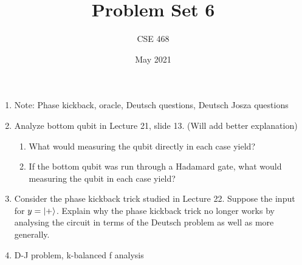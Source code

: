 \documentclass[12pt]{article}
\title{Problem Set 6}
\author{CSE 468}
\date{May 2021}
\begin{document}
\maketitle



\begin{enumerate}[font=\bfseries]

    \item Note: Phase kickback, oracle, Deutsch questions, Deutsch Josza questions
    \item Analyze bottom qubit in Lecture 21, slide 13. (Will add better explanation)
    \begin{enumerate}
        \item What would measuring the qubit directly in each case yield?
        \item If the bottom qubit was run through a Hadamard gate, what would measuring the qubit in each case yield?
    \end{enumerate}
    \item Consider the phase kickback trick studied in Lecture 22. Suppose the input for $y = \ket{+}$. Explain why the phase kickback trick no longer works by analysing the circuit in terms of the Deutsch problem as well as more generally.
    \item D-J problem, k-balanced f analysis
    
\end{enumerate}
\end{document}
